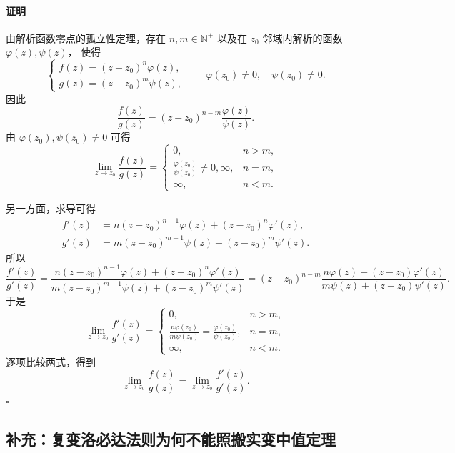 \paragraph{证明}
由解析函数零点的孤立性定理，存在 $n,m\in\mathbb N^+$
以及在 $z_0$ 邻域内解析的函数 $\varphi(z),\psi(z)$，
使得
\[
  \begin{cases}
    f(z)=(z-z_0)^n\varphi(z),\\
    g(z)=(z-z_0)^m\psi(z),
  \end{cases}
  \qquad
  \varphi(z_0)\ne0,\quad \psi(z_0)\ne0.
\]
因此
\[
  \frac{f(z)}{g(z)}
  =(z-z_0)^{n-m}\frac{\varphi(z)}{\psi(z)}.
\]
由 $\varphi(z_0),\psi(z_0)\ne0$ 可得
\[
  \lim_{z\to z_0}\frac{f(z)}{g(z)}
  =
  \begin{cases}
     0, & n>m,\\[2pt]
     \displaystyle\frac{\varphi(z_0)}{\psi(z_0)}
       \ne0,\infty, & n=m,\\[7pt]
     \infty, & n<m.
  \end{cases}
\]

另一方面，求导可得
\[
  \begin{aligned}
    f'(z)&=n(z-z_0)^{n-1}\varphi(z)
             +(z-z_0)^n\varphi'(z),\\
    g'(z)&=m(z-z_0)^{m-1}\psi(z)
             +(z-z_0)^m\psi'(z).
  \end{aligned}
\]
所以
\[
  \frac{f'(z)}{g'(z)}
  =\frac{n(z-z_0)^{n-1}\varphi(z)+(z-z_0)^n\varphi'(z)}
         {m(z-z_0)^{m-1}\psi(z)+(z-z_0)^m\psi'(z)}
  =(z-z_0)^{n-m}
  \frac{n\varphi(z)+(z-z_0)\varphi'(z)}
       {m\psi(z)+(z-z_0)\psi'(z)}.
\]
于是
\[
  \lim_{z\to z_0}\frac{f'(z)}{g'(z)}
  =
  \begin{cases}
     0, & n>m,\\[2pt]
     \displaystyle\frac{n\varphi(z_0)}{m\psi(z_0)}
      =\frac{\varphi(z_0)}{\psi(z_0)}, & n=m,\\[7pt]
     \infty, & n<m.
  \end{cases}
\]
逐项比较两式，得到
\[
  \boxed{\lim_{z\to z_0}\frac{f(z)}{g(z)}
  =\lim_{z\to z_0}\frac{f'(z)}{g'(z)}.}
\]
\hfill$\square$


\subsection*{补充：复变洛必达法则为何不能照搬实变中值定理}

